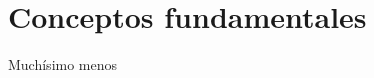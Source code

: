 \documentclass[12pt]{report}
\begin{document}
	\section{Conceptos fundamentales}
		Muchísimo menos
\end{document}
